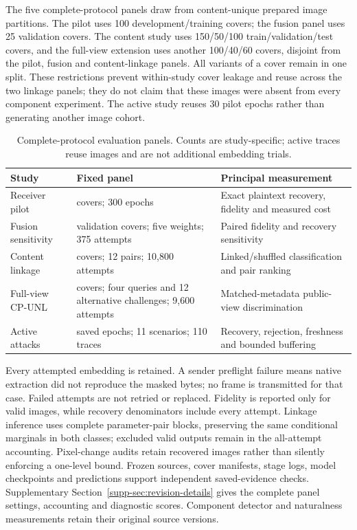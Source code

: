 \documentclass[pdflatex,sn-mathphys-num]{sn-jnl}%
\renewcommand{\arraystretch}{1.2}
\renewcommand{\arraystretch}{1.0}
\theoremstyle{definition}
\theoremstyle{game}
\theoremstyle{thmstyleone}%
\theoremstyle{thmstyletwo}%
\theoremstyle{thmstylethree}%
\begin{document}
The five complete-protocol panels draw from content-unique prepared image
partitions. The pilot uses 100 development/training covers; the fusion
panel uses 25 validation covers. The content study uses 150/50/100
train/validation/test covers, and the full-view extension uses another
100/40/60 covers, disjoint from the pilot, fusion and content-linkage panels. All
variants of a cover remain in one split. These restrictions prevent
within-study cover leakage and reuse across the two linkage panels;
they do not claim that these images were absent from every component
experiment. The active study reuses 30 pilot epochs rather
than generating another image cohort.

\begin{table}[!t]
\centering\small
\caption{Complete-protocol evaluation panels. Counts are study-specific;
active traces reuse images and are not additional embedding trials.}
\label{tab:revision-study-design}
\setlength{\tabcolsep}{4pt}\renewcommand{\arraystretch}{1.12}
\begin{tabularx}{\textwidth}{@{}l>{\raggedright\arraybackslash}X>{\raggedright\arraybackslash}X@{}}
\toprule
Study & Fixed panel & Principal measurement\\
\midrule
Receiver pilot & 100 covers; 300 epochs & Exact plaintext recovery, fidelity and measured cost\\
Fusion sensitivity & 25 validation covers; five weights; 375 attempts & Paired fidelity and recovery sensitivity\\
Content linkage & 300 covers; 12 pairs; 10,800 attempts & Linked/shuffled classification and pair ranking\\
Full-view CP-UNL & 200 covers; four queries and 12 alternative challenges; 9,600 attempts & Matched-metadata public-view discrimination\\
Active attacks & 30 saved epochs; 11 scenarios; 110 traces & Recovery, rejection, freshness and bounded buffering\\
\bottomrule
\end{tabularx}
\end{table}

Every attempted embedding is retained. A sender preflight failure means
native extraction did not reproduce the masked bytes; no frame is
transmitted for that case. Failed attempts are not retried or replaced.
Fidelity is reported only for valid images, while recovery denominators
include every attempt. Linkage inference uses complete parameter-pair
blocks, preserving the same conditional marginals in both classes;
excluded valid outputs remain in the all-attempt accounting. Pixel-change
audits retain recovered images rather than silently enforcing a one-level
bound. Frozen sources, cover manifests, stage logs, model checkpoints and
predictions support independent saved-evidence checks. Supplementary
Section~\ref{supp-sec:revision-details} gives the complete panel settings,
accounting and diagnostic scores. Component detector and naturalness
measurements retain their original source versions.
\end{document}
